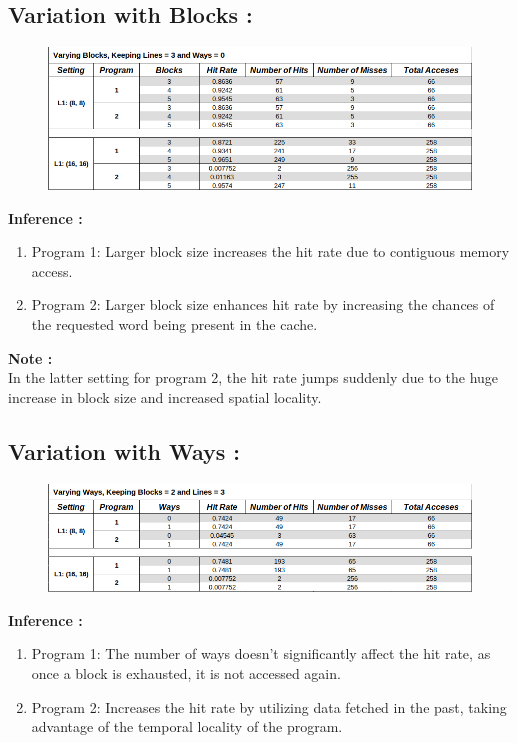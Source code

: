 \documentclass{article}
\begin{document}
\subsection{Variation with Blocks :}
\begin{figure}[H]
  \centering
  \includegraphics[width=1\textwidth]{1.2.png}
  \label{fig:example}
\end{figure}
\noindent
\textbf{\large{Inference :}}\\
\begin{enumerate}[label=\alph*)]
  \item Program 1: Larger block size increases the hit rate due to contiguous memory access.
  \item Program 2: Larger block size enhances hit rate by increasing the chances of the requested word being present in the cache.
\end{enumerate}
\textbf{\large{Note :}}\\
In the latter setting for program 2, the hit rate jumps suddenly due to the huge increase in block size and increased spatial locality.
\smallskip

\subsection{Variation with Ways :}
\begin{figure}[H]
  \centering
  \includegraphics[width=1\textwidth]{1.3.png}
  \label{fig:example}
\end{figure}
\noindent
\textbf{\large{Inference :}}\\
\begin{enumerate}[label=\alph*)]
  \item Program 1: The number of ways doesn't significantly affect the hit rate, as once a block is exhausted, it is not accessed again.
  \item Program 2: Increases the hit rate by utilizing data fetched in the past, taking advantage of the temporal locality of the program.
\end{enumerate}
\smallskip
\end{document}
